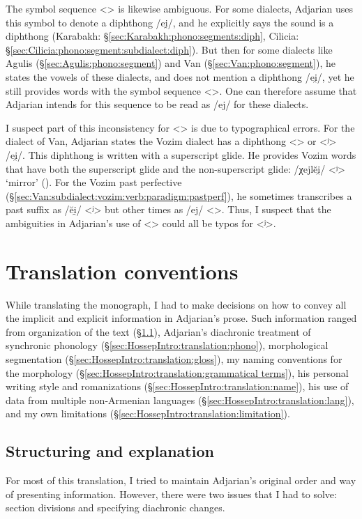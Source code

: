 \documentclass[output=paper]{langscibook}
\begin{document}
The symbol sequence <> is likewise ambiguous. For some dialects, Adjarian uses this symbol to denote a diphthong /ei̯/, and he explicitly says the sound is a diphthong (Karabakh: \S\ref{sec:Karabakh:phono:segments:diph}, Cilicia: \S\ref{sec:Cilicia:phono:segment:subdialect:diph}). But then for some dialects like Agulis (\S\ref{sec:Agulis:phono:segment}) and Van (\S\ref{sec:Van:phono:segment}), he states the vowels of these dialects, and does not mention a diphthong /ei̯/, yet he still provides words with the symbol sequence <>. One can therefore assume that Adjarian intends for this sequence to be read as /ej/ for these dialects.  

I suspect part of this inconsistency for <> is due to typographical errors. For the dialect of Van, Adjarian states the Vozim dialect has a diphthong <\textsuperscript{}> or <ʲ> /ei̯/. This diphthong is written with a superscript glide. He provides Vozim words that have both the superscript glide and the non-superscript glide: /χejlĕi̯/ <ʲ> `mirror' ().   For the Vozim past perfective (\S\ref{sec:Van:subdialect:vozim:verb:paradigm:pastperf}), he sometimes transcribes a past suffix as /ĕi̯/ <ʲ> but other times as /ej/ <>. Thus, I suspect that the ambiguities in Adjarian's use of <> could all be typos for <ʲ>. 

\section{Translation conventions}\label{sec:HossepIntro:translation}
While translating the monograph, I had to make decisions on how to convey all the implicit and explicit information in Adjarian's prose. Such information ranged from organization of the text (\S\ref{sec:HossepIntro:translation:exp}),  Adjarian's diachronic treatment of synchronic phonology  (\S\ref{sec:HossepIntro:translation:phono}),   morphological segmentation (\S\ref{sec:HossepIntro:translation:gloss}), my naming conventions for the morphology (\S\ref{sec:HossepIntro:translation:grammatical terms}),  his personal writing style and romanizations (\S\ref{sec:HossepIntro:translation:name}),  his use of data from multiple non\hyp Armenian languages (\S\ref{sec:HossepIntro:translation:lang}), and my own limitations (\S\ref{sec:HossepIntro:translation:limitation}).
\subsection{Structuring and explanation}\label{sec:HossepIntro:translation:exp}
For most of this translation, I tried to maintain Adjarian's original order and way of presenting information. However, there were two issues that I had to solve: section divisions and specifying diachronic changes. 
\end{document}
